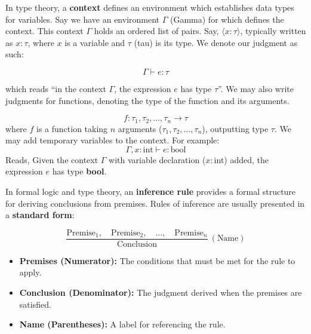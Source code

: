 \vspace{-.5em}
\begin{Def}

    In type theory, a \textbf{context} defines an environment which establishes data types for variables.
    Say we have an environment $\Gamma$ (Gamma) for which defines the context. This context $\Gamma$ holds 
    an ordered list of pairs. Say, $\langle x : \tau \rangle$, typically written as $x : \tau$,
    where $x$ is a variable and $\tau$ (tau) is its type. We denote our judgment as such:
    \LARGE

    \vspace{-1em}
    \[\Gamma \vdash e: \tau\]

    \normalsize 
    \noindent
    which reads ``in the context $\Gamma$, the expression $e$ has type $\tau$''. 
    We may also write judgments for functions, denoting the type of the function and its arguments.
    
    \vspace{-1em}
    \Large
    \[ f : \tau_1, \tau_2, \ldots, \tau_n \rightarrow \tau \]
    \normalsize
    \noindent 
    where $f$ is a function taking $n$ arguments ($\tau_1, \tau_2, \ldots, \tau_n$), outputting type $\tau$. We may add 
    temporary variables to the context. For example: 
    \[\Gamma, x : \text{int}\vdash e : \text{bool}\] 
    Reads,
    Given the context $\Gamma$ with variable declaration ($x:$int) added, the expression $e$ has type \textbf{bool}. \hfill \cite{WikipediaTypingEnvironment}
\end{Def}

\newpage 

\begin{Def}

    In formal logic and type theory, an \textbf{inference rule} provides a formal structure for deriving conclusions from premises. 
    Rules of inference are usually presented in a \textbf{standard form}: \Large

    \[
    \frac{\text{Premise}_1, \quad \text{Premise}_2, \quad \ldots, \quad \text{Premise}_n}{\text{Conclusion}} \ (\text{Name})
    \]

    \normalsize
    \begin{itemize}
        \item \textbf{Premises (Numerator):} The conditions that must be met for the rule to apply.
        \item \textbf{Conclusion (Denominator):} The judgment derived when the premises are satisfied.
        \item \textbf{Name (Parentheses):} A label for referencing the rule. \hfill \cite{wiki:rule_of_inference}
    \end{itemize}
\end{Def}


